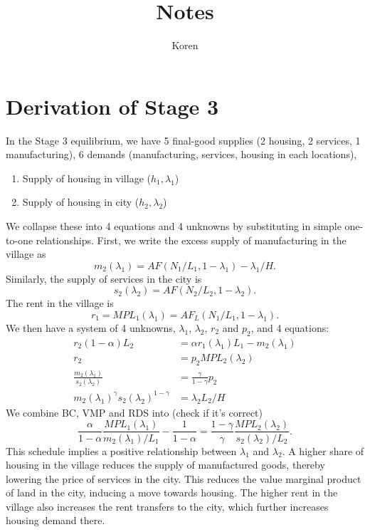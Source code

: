 \documentclass{amsart}
\theoremstyle{definition}
\theoremstyle{remark}
\numberwithin{equation}{section}
\begin{document}
\title{Notes}%
\author{Koren}%

\section{Derivation of Stage 3}
In the Stage 3 equilibrium, we have 5 final-good supplies (2 housing, 2 services, 1 manufacturing), 6 demands (manufacturing, services, housing in each locations),

\begin{enumerate}
  \item Supply of housing in village ($h_1,\lambda_1$)
  \item Supply of housing in city ($h_2,\lambda_2$)
\end{enumerate}

We collapse these into 4 equations and 4 unknowns by substituting in simple one-to-one relationships. First, we write the excess supply of manufacturing in the village as
\[
m_2(\lambda_1) = AF(N_1/L_1,1-\lambda_1) - \lambda_1/H.
\]
Similarly, the supply of services in the city is
\[
s_2(\lambda_2) = AF(N_2/L_2,1-\lambda_2).
\]
The rent in the village is
\[
r_1 = MPL_1(\lambda_1) = AF_L(N_1/L_1,1-\lambda_1).
\]
We then have a system of 4 unknowns, $\lambda_1$, $\lambda_2$, $r_2$ and $p_2$, and 4 equations:
\begin{align}
r_2(1-\alpha)L_2 &= \alpha r_1(\lambda_1) L_1 - m_2(\lambda_1) \tag{budget constraint}\\
r_2              &= p_2 MPL_2(\lambda_2) \tag{value marginal product}\\
\frac{m_2(\lambda_1)}{s_2(\lambda_2)} &= \frac{\gamma}{1-\gamma}p_2 \tag{relative demand of services}\\
m_2(\lambda_1)^\gamma s_2(\lambda_2)^{1-\gamma} &= \lambda_2 L_2/H \tag{relative demand of housing}
\end{align}
We combine BC, VMP and RDS into (check if it's correct)
\begin{equation}
\frac{\alpha}{1-\alpha}\frac{MPL_1(\lambda_1)}{m_2(\lambda_1)/L_1} - \frac{1}{1-\alpha} = \frac{1-\gamma}{\gamma} \frac{MPL_2(\lambda_2)}{s_2(\lambda_2)/L_2}.
\end{equation}
This schedule implies a positive relationship between $\lambda_1$ and $\lambda_2$. A higher share of housing in the village reduces the supply of manufactured goods, thereby lowering the price of services in the city. This reduces the value marginal product of land in the city, inducing a move towards housing. The higher rent in the village also increases the rent transfers to the city, which further increases housing demand there.
\end{document}
